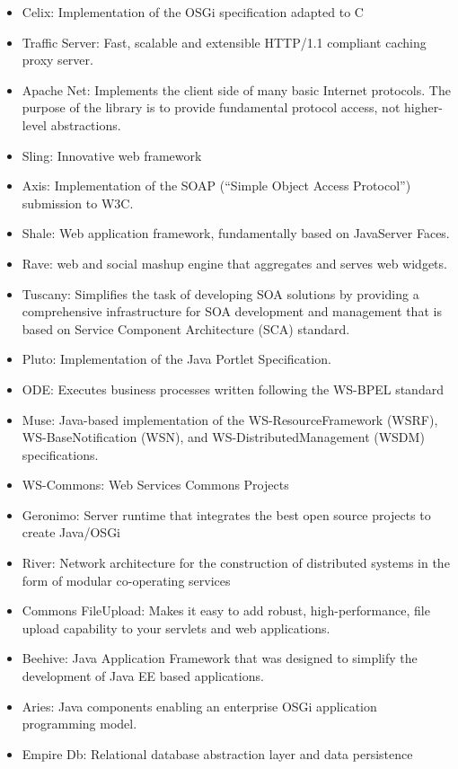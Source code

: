 \documentclass[12pt]{report}
\begin{document}
\begin{itemize}
\item
  Celix: Implementation of the OSGi specification adapted to C
\item
  Traffic Server: Fast, scalable and extensible HTTP/1.1 compliant
  caching proxy server.
\item
  Apache Net: Implements the client side of many basic Internet
  protocols. The purpose of the library is to provide fundamental
  protocol access, not higher-level abstractions.
\item
  Sling: Innovative web framework
\item
  Axis: Implementation of the SOAP (``Simple Object Access Protocol'')
  submission to W3C.
\item
  Shale: Web application framework, fundamentally based on JavaServer
  Faces.
\item
  Rave: web and social mashup engine that aggregates and serves web
  widgets.
\item
  Tuscany: Simplifies the task of developing SOA solutions by providing
  a comprehensive infrastructure for SOA development and management that
  is based on Service Component Architecture (SCA) standard.
\item
  Pluto: Implementation of the Java Portlet Specification.
\item
  ODE: Executes business processes written following the WS-BPEL
  standard
\item
  Muse: Java-based implementation of the WS-ResourceFramework (WSRF),
  WS-BaseNotification (WSN), and WS-DistributedManagement (WSDM)
  specifications.
\item
  WS-Commons: Web Services Commons Projects
\item
  Geronimo: Server runtime that integrates the best open source projects
  to create Java/OSGi
\item
  River: Network architecture for the construction of distributed
  systems in the form of modular co-operating services
\item
  Commons FileUpload: Makes it easy to add robust, high-performance,
  file upload capability to your servlets and web applications.
\item
  Beehive: Java Application Framework that was designed to simplify the
  development of Java EE based applications.
\item
  Aries: Java components enabling an enterprise OSGi application
  programming model.
\item
  Empire Db: Relational database abstraction layer and data persistence

\end{itemize}
\end{document}
